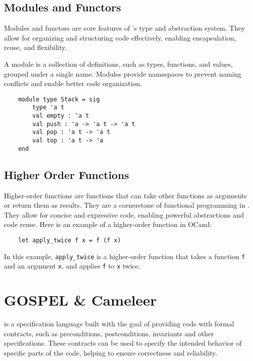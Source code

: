 \subsection{Modules and Functors} %
\label{sub:modules_and_functors}

Modules and functors are core features of \ocaml’s type and abstraction system. 
They allow for organizing and structuring code effectively, enabling encapsulation, 
reuse, and flexibility.

A module is a collection of definitions, such as types, functions, and values, 
grouped under a single name. Modules provide namespaces to prevent naming conflicts 
and enable better code organization.

\begin{verbatim}
    module type Stack = sig
        type 'a t
        val empty : 'a t
        val push : 'a -> 'a t -> 'a t
        val pop : 'a t -> 'a t
        val top : 'a t -> 'a
    end
\end{verbatim}

\subsection{Higher Order Functions}
\label{sub:higher_order_functions}

Higher-order functions are functions that can take other functions as arguments 
or return them as results. They are a cornerstone of functional programming in \ocaml.
They allow 
for concise and expressive code, enabling powerful abstractions and code reuse. 
Here is an example of a higher-order function in OCaml:

\begin{verbatim}
    let apply_twice f x = f (f x)
\end{verbatim}

In this example, \texttt{apply\_twice} is a higher-order function that takes a function 
\texttt{f} and an argument \texttt{x}, and applies \texttt{f} to \texttt{x} twice.

\section{GOSPEL \& Cameleer}
\label{sec:gospel_and_cameleer}

\gospel is a specification language built with the goal of providing \ocaml code 
with formal contracts, such as preconditions, postconditions, invariants and other 
specifications. These contracts can be used to specify the intended behavior of 
specific parts of the code, helping to ensure correctness and reliability.

